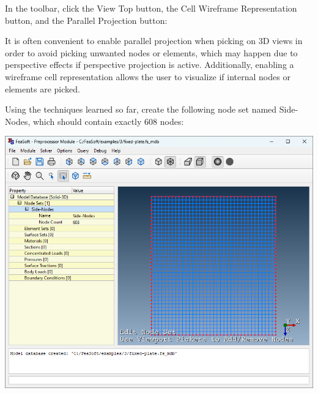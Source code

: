 \documentclass[
    11pt,        %
    a4paper,     %
    final,       %
    fleqn,       %
    notitlepage, %
    onecolumn,   %
    oneside,     %
]{article}
\begin{document}
In the toolbar, click the View Top button, the Cell Wireframe Representation button, and the Parallel Projection button:
\begin{center}
\end{center}
It is often convenient to enable parallel projection when picking on 3D views in order to avoid picking unwanted nodes or elements, which may happen due to perspective effects if perspective projection is active. Additionally, enabling a wireframe cell representation allows the user to visualize if internal nodes or elements are picked.

Using the techniques learned so far, create the following node set named Side-Nodes, which should contain exactly 608 nodes:
\begin{center}
    \includegraphics[scale=0.5]{fig/ui-3-3.png}
\end{center}
\end{document}

